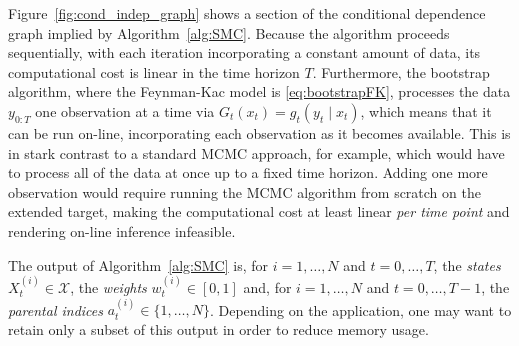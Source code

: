 Figure~\ref{fig:cond_indep_graph} shows a section of the conditional dependence graph implied by Algorithm~\ref{alg:SMC}.
Because the algorithm proceeds sequentially, with each iteration incorporating a constant amount of data, its computational cost is linear in the time horizon $T$. Furthermore, the bootstrap algorithm, where the Feynman-Kac model is \eqref{eq:bootstrapFK}, processes the data $y_{0:T}$ one observation at a time via $G_t(x_t) = g_t(y_t \mid x_t)$, which means that it can be run on-line, incorporating each observation as it becomes available.
This is in stark contrast to a standard MCMC approach, for example, which would have to process all of the data at once up to a fixed time horizon. Adding one more observation would require running the MCMC algorithm from scratch on the extended target, making the computational cost at least linear \emph{per time point} and rendering on-line inference infeasible.

The output of Algorithm~\ref{alg:SMC} is, for $i=1,\dots, N$ and $t=0,\dots,T$, the \emph{states} $X_t^{(i)} \in \mathcal{X}$, the \emph{weights} $w_t^{(i)} \in [0,1]$ and, for $i=1,\dots, N$ and $t=0,\dots,T-1$, the \emph{parental indices} $a_t^{(i)} \in \{1,\dots,N\}$.
Depending on the application, one may want to retain only a subset of this output in order to reduce memory usage.

